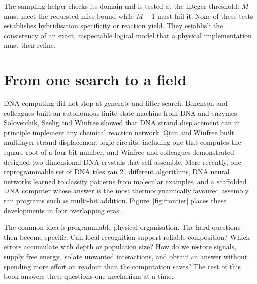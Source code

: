 The sampling helper checks its domain and is tested at the integer threshold: $M$
must meet the requested miss bound while $M-1$ must fail it. None of these tests
establishes hybridisation specificity or reaction yield. They establish the
consistency of an exact, inspectable logical model that a physical implementation
must then refine.

\section{From one search to a field}\label{sec:frontier}
DNA computing did not stop at generate-and-filter search. Benenson and colleagues
built an autonomous finite-state machine from DNA and enzymes.\cite{Benenson2001}
Soloveichik, Seelig and Winfree showed that DNA strand displacement can in
principle implement any chemical reaction network.\cite{Soloveichik2010} Qian and
Winfree built multilayer strand-displacement logic circuits, including one that
computes the square root of a four-bit number,\cite{QianWinfree2011} and Winfree and colleagues demonstrated designed
two-dimensional DNA crystals that self-assemble.\cite{Winfree1998} More recently,
one reprogrammable set of DNA tiles ran 21 different algorithms,\cite{Woods2019}
DNA neural networks learned to classify patterns from molecular
examples,\cite{CherryQian2025} and a scaffolded DNA computer whose answer is the
most thermodynamically favoured assembly ran programs such as multi-bit
addition.\cite{Sterin2026} Figure~\ref{fig:frontier} places these developments in
four overlapping eras.


The common idea is programmable physical organisation. The hard questions then
become specific. Can local recognition support reliable composition? Which
errors accumulate with depth or population size? How do we restore signals,
supply free energy, isolate unwanted interactions, and obtain an answer without
spending more effort on readout than the computation saves? The rest of this
book answers these questions one mechanism at a time.

